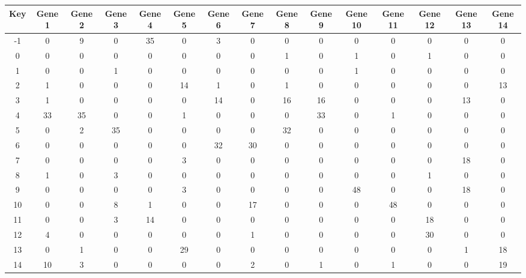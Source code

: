 \begin{tabular}{|c|c|c|c|c|c|c|c|c|c|c|c|c|c|c|}
\hline
Key & Gene 1 & Gene 2 & Gene 3 & Gene 4 & Gene 5 & Gene 6 & Gene 7 & Gene 8 & Gene 9 & Gene 10 & Gene 11 & Gene 12 & Gene 13 & Gene 14 \\
\hline
-1 & 0 & 9 & 0 & 35 & 0 & 3 & 0 & 0 & 0 & 0 & 0 & 0 & 0 & 0 \\
0 & 0 & 0 & 0 & 0 & 0 & 0 & 0 & 1 & 0 & 1 & 0 & 1 & 0 & 0 \\
1 & 0 & 0 & 1 & 0 & 0 & 0 & 0 & 0 & 0 & 1 & 0 & 0 & 0 & 0 \\
2 & 1 & 0 & 0 & 0 & 14 & 1 & 0 & 1 & 0 & 0 & 0 & 0 & 0 & 13 \\
3 & 1 & 0 & 0 & 0 & 0 & 14 & 0 & 16 & 16 & 0 & 0 & 0 & 13 & 0 \\
4 & 33 & 35 & 0 & 0 & 1 & 0 & 0 & 0 & 33 & 0 & 1 & 0 & 0 & 0 \\
5 & 0 & 2 & 35 & 0 & 0 & 0 & 0 & 32 & 0 & 0 & 0 & 0 & 0 & 0 \\
6 & 0 & 0 & 0 & 0 & 0 & 32 & 30 & 0 & 0 & 0 & 0 & 0 & 0 & 0 \\
7 & 0 & 0 & 0 & 0 & 3 & 0 & 0 & 0 & 0 & 0 & 0 & 0 & 18 & 0 \\
8 & 1 & 0 & 3 & 0 & 0 & 0 & 0 & 0 & 0 & 0 & 0 & 1 & 0 & 0 \\
9 & 0 & 0 & 0 & 0 & 3 & 0 & 0 & 0 & 0 & 48 & 0 & 0 & 18 & 0 \\
10 & 0 & 0 & 8 & 1 & 0 & 0 & 17 & 0 & 0 & 0 & 48 & 0 & 0 & 0 \\
11 & 0 & 0 & 3 & 14 & 0 & 0 & 0 & 0 & 0 & 0 & 0 & 18 & 0 & 0 \\
12 & 4 & 0 & 0 & 0 & 0 & 0 & 1 & 0 & 0 & 0 & 0 & 30 & 0 & 0 \\
13 & 0 & 1 & 0 & 0 & 29 & 0 & 0 & 0 & 0 & 0 & 0 & 0 & 1 & 18 \\
14 & 10 & 3 & 0 & 0 & 0 & 0 & 2 & 0 & 1 & 0 & 1 & 0 & 0 & 19 \\
\hline
\end{tabular}